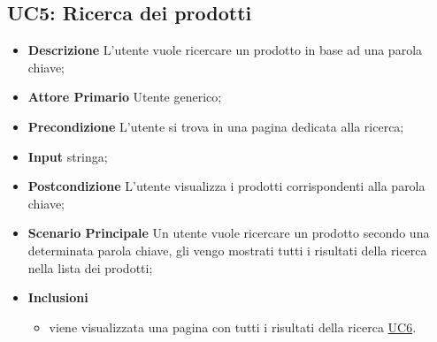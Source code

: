         \subsection{UC5: Ricerca dei prodotti}
        \label{sec:UC5}
        \begin{itemize}
            \item \textbf{Descrizione} L'utente vuole ricercare un prodotto in base ad una parola chiave; 
            \item \textbf{Attore Primario} Utente generico;
            \item \textbf{Precondizione} L'utente si trova in una pagina dedicata alla ricerca; 
            \item \textbf{Input} stringa;
            \item \textbf{Postcondizione} L'utente visualizza i prodotti corrispondenti alla parola chiave;
            \item \textbf{Scenario Principale} Un utente vuole ricercare un prodotto secondo una determinata parola chiave, gli vengo mostrati tutti i risultati della ricerca nella lista dei prodotti;
            \item \textbf{Inclusioni}
            \begin{itemize}
                \item viene visualizzata una pagina con tutti i risultati della ricerca \hyperref[sec:UC6]{UC6}.
            \end{itemize}
        \end{itemize}
